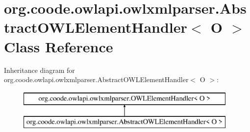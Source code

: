 \hypertarget{classorg_1_1coode_1_1owlapi_1_1owlxmlparser_1_1_abstract_o_w_l_element_handler_3_01_o_01_4}{\section{org.\-coode.\-owlapi.\-owlxmlparser.\-Abstract\-O\-W\-L\-Element\-Handler$<$ O $>$ Class Reference}
\label{classorg_1_1coode_1_1owlapi_1_1owlxmlparser_1_1_abstract_o_w_l_element_handler_3_01_o_01_4}
}
Inheritance diagram for org.\-coode.\-owlapi.\-owlxmlparser.\-Abstract\-O\-W\-L\-Element\-Handler$<$ O $>$\-:\begin{figure}[H]
\begin{center}
\leavevmode
\includegraphics[height=2.000000cm]{classorg_1_1coode_1_1owlapi_1_1owlxmlparser_1_1_abstract_o_w_l_element_handler_3_01_o_01_4}
\end{center}
\end{figure}
